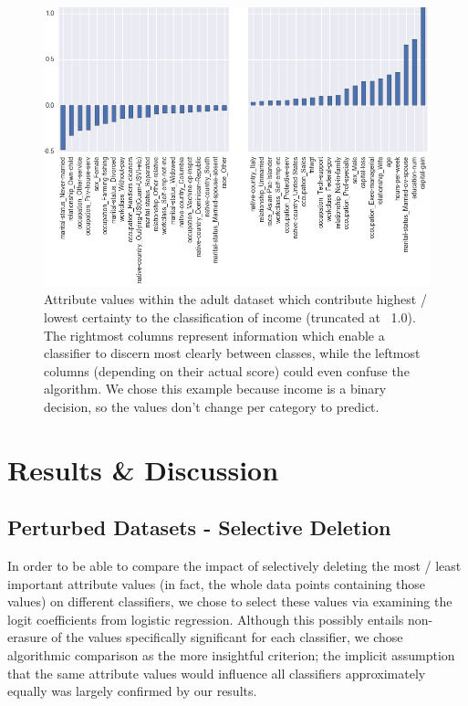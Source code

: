 \documentclass{llncs}
\begin{document}
\begin{figure}[H]
	\begin{center}
    	\hspace*{-0.8cm}
		\includegraphics[width=1.1\textwidth]{figures/theory/important_columns_income_truncated}
		\caption{Attribute values within the adult dataset which contribute highest / lowest certainty to the classification of income (truncated at ~1.0). The rightmost columns represent information which enable a classifier to discern most clearly between classes, while the leftmost columns (depending on their actual score) could even confuse the algorithm. We chose this example because income is a binary decision, so the values don't change per category to predict.}
		\label{fig:adult_important_columns}
	\end{center}
\end{figure}



\section{Results \& Discussion}
\label{sect:results}


\subsection{Perturbed Datasets - Selective Deletion}
\label{ssect:selective_deletion}

In order to be able to compare the impact of selectively deleting the most / least important attribute values (in fact, the whole data points containing those values) on different classifiers, we chose to select these values via examining the logit coefficients from logistic regression. Although this possibly entails non-erasure of the values specifically significant for each classifier, we chose algorithmic comparison as the more insightful criterion; the implicit assumption that the same attribute values would influence all classifiers approximately equally was largely confirmed by our results.
\end{document}
